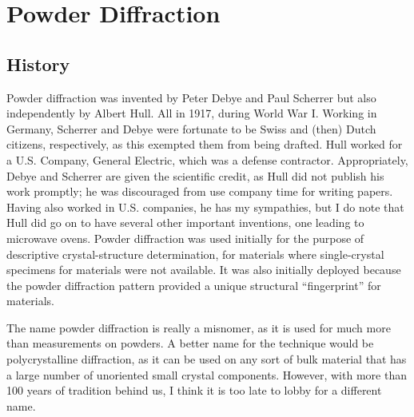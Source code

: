 \chapter{Powder Diffraction}
\label{Chap:powder}

\section{History}
Powder diffraction was invented by Peter Debye and Paul Scherrer but also independently by Albert Hull. All in 1917, during World War I.
Working in Germany, Scherrer and Debye were fortunate to be Swiss and (then) Dutch citizens, respectively, as this exempted them from being drafted. Hull worked for a U.S. Company, General Electric, which was a defense contractor. Appropriately, Debye and Scherrer are given the scientific credit, as Hull did not publish his work promptly; he was discouraged from use company time for writing papers. 
Having also worked in U.S. companies, he has my sympathies, but I do note that Hull did go on to have several other important inventions, one leading to microwave ovens.
Powder diffraction was used initially for the purpose of descriptive crystal-structure determination, for materials where single-crystal specimens for materials were not available. 
It was also initially deployed because the powder diffraction pattern provided a unique structural ``fingerprint'' for materials.

The name powder diffraction is really a misnomer, as it is used for much more than measurements on powders. A better name for the technique would be polycrystalline diffraction, as it can be used on any sort of bulk material that has a large number of unoriented small crystal components. However, with more than 100 years of tradition behind us, I think it is too late to lobby for a different name. 

